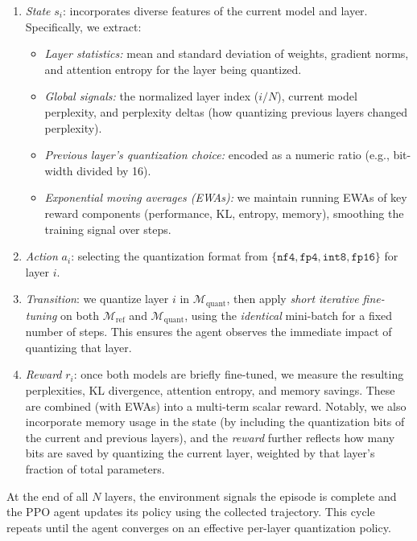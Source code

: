 \documentclass{article}
\begin{document}
	\begin{enumerate}
		\item \textit{State} $s_i$: incorporates diverse features of the current model and layer. Specifically, we extract:
		\begin{itemize}
			\item \emph{Layer statistics:} mean and standard deviation of weights, gradient norms, and attention entropy for the layer being quantized.
			\item \emph{Global signals:} the normalized layer index ($i/N$), current model perplexity, and perplexity deltas (how quantizing previous layers changed perplexity).
			\item \emph{Previous layer's quantization choice:} encoded as a numeric ratio (e.g., bit-width divided by 16).
			\item \emph{Exponential moving averages (EWAs):} we maintain running EWAs of key reward components (performance, KL, entropy, memory), smoothing the training signal over steps.
		\end{itemize}
		
		\item \textit{Action} $a_i$: selecting the quantization format from $\{\texttt{nf4}, \texttt{fp4}, \texttt{int8}, \texttt{fp16}\}$ for layer $i$.
		
		\item \textit{Transition}: we quantize layer $i$ in $\mathcal{M}_{\text{quant}}$, then apply \emph{short iterative fine-tuning} on both $\mathcal{M}_{\text{ref}}$ and $\mathcal{M}_{\text{quant}}$, using the \emph{identical} mini-batch for a fixed number of steps. This ensures the agent observes the immediate impact of quantizing that layer.
		
		\item \textit{Reward} $r_i$: once both models are briefly fine-tuned, we measure the resulting perplexities, KL divergence, attention entropy, and memory savings. These are combined (with EWAs) into a multi-term scalar reward. Notably, we also incorporate memory usage in the state (by including the quantization bits of the current and previous layers), and the \emph{reward} further reflects how many bits are saved by quantizing the current layer, weighted by that layer's fraction of total parameters.		
	\end{enumerate}
	
	At the end of all $N$ layers, the environment signals the episode is complete and the PPO agent updates its policy using the collected trajectory. This cycle repeats until the agent converges on an effective per-layer quantization policy.
	
\end{document}
